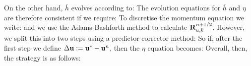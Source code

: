 \documentclass[10pt]{article}
\begin{document}
 			\linebreak
 			On the other hand, $\bar{h}$ evolves according to:
 			The evolution equations for $\bar{h}$ and $\eta$ are therefore consistent if we require:
 			To discretise the momentum equation we write:
 			and we use the Adams-Bashforth method to calculate $\mathbf{R}_{u,k}^{n+1/2}$. However, we split this into two steps using a predictor-corrector method:
 			So if, after the first step we define $\Delta \mathbf{u} : = \textbf{u}^{*} - \mathbf{u}^{n}$, then the $\eta$ equation becomes:
 			Overall, then, the strategy is as follows:
\end{document}
